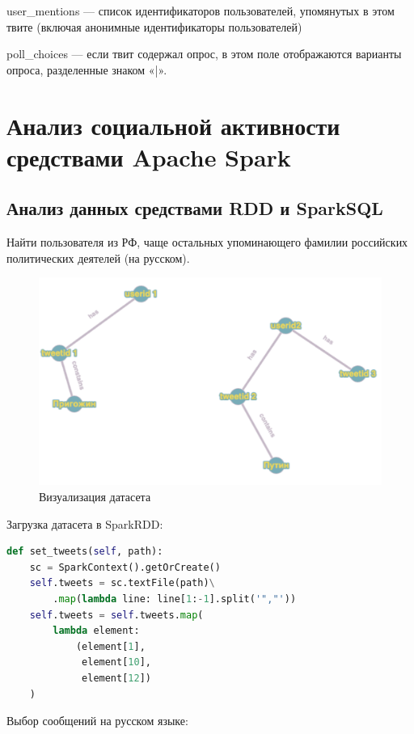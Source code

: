 user\_mentions — список идентификаторов пользователей, упомянутых в этом твите (включая анонимные идентификаторы пользователей)

poll\_choices — если твит содержал опрос, в этом поле отображаются варианты опроса, разделенные знаком «|».



\section{Анализ социальной активности средствами Apache Spark}

\subsection{Анализ данных средствами RDD и SparkSQL}

Найти пользователя из РФ, чаще остальных упоминающего фамилии российских политических деятелей (на русском).

\begin{figure}[htb]
	\centering
	\includegraphics[width=.9\textwidth]{rddgraph.png}
	\parskip=6pt
	\caption{Визуализация датасета}
	\label{fig:gfpic}
\end{figure}

Загрузка датасета в SparkRDD:

\begin{lstlisting}[language={Python}, caption={Нахождение наибольшей компоненты связанности}, label=lst:rdd1]
def set_tweets(self, path):
	sc = SparkContext().getOrCreate()
	self.tweets = sc.textFile(path)\
		.map(lambda line: line[1:-1].split('","'))
	self.tweets = self.tweets.map(
		lambda element: 
			(element[1], 
			 element[10], 
			 element[12])
	)
\end{lstlisting}

Выбор сообщений на русском языке:

